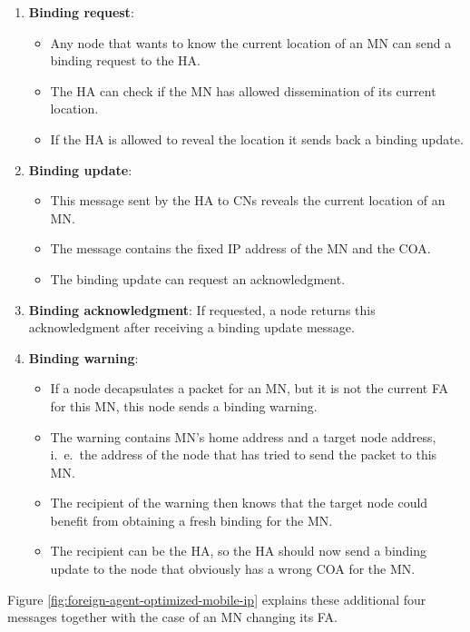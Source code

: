\begin{enumerate}
\item \textbf{Binding request}: 
\begin{itemize}
	\item Any node that wants to know the current location of an MN can send a binding request to the HA. 
	\item The HA can check if the MN has allowed dissemination of its current location. 
	\item If the HA is allowed to reveal the location it sends back a binding update.
\end{itemize}

\item \textbf{Binding update}:
\begin{itemize}
	\item This message sent by the HA to CNs reveals the current location of an MN. 
	\item The message contains the fixed IP address of the MN and the COA. 
	\item The binding update can request an acknowledgment.
\end{itemize}


\item \textbf{Binding acknowledgment}: If requested, a node returns this acknowledgment after receiving a binding update message.

\item \textbf{Binding warning}: 
\begin{itemize}
	\item If a node decapsulates a packet for an MN, but it is not the current FA for this MN, this node sends a binding warning. 
	\item The warning contains MN’s home address and a target node address, i.\ e.\, the address of the node that has tried to send the packet to this MN. 
	\item The recipient of the warning then knows that the target node could benefit from obtaining a fresh binding for the MN. 
	\item The recipient can be the HA, so the HA should now send a binding update to the node that obviously has a wrong COA for the MN.
\end{itemize}

\end{enumerate}

Figure \ref{fig:foreign-agent-optimized-mobile-ip} explains these additional four messages together with the case of an MN changing its FA. 

